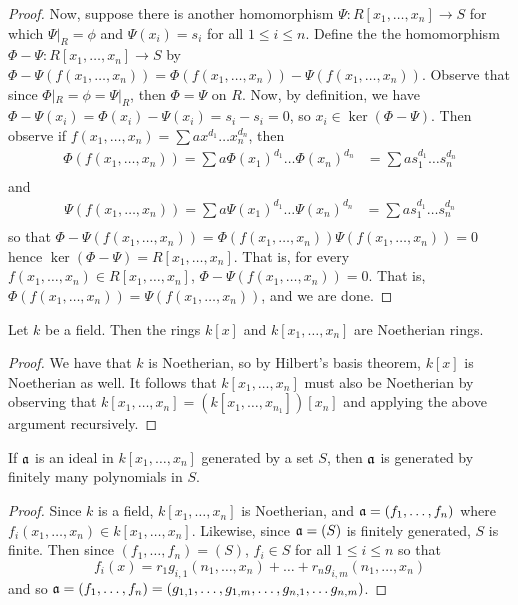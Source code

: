 \begin{proof}
  Now, suppose there is another homomorphism $\Psi:R[x_1, \dots, x_n]
  \xrightarrow{} S$ for which $\Psi|_R=\phi$ and $\Psi(x_i)=s_i$ for
  all $1 \leq i \leq n$. Define the the homomorphism $\Phi-\Psi:R[x_1,
  \dots, x_n] \xrightarrow{} S$ by $\Phi-\Psi(f(x_1, \dots,
  x_n))=\Phi(f(x_1, \dots, x_n))-\Psi(f(x_1, \dots, x_n))$. Observe
  that since $\Phi|_R=\phi=\Psi|_R$, then $\Phi=\Psi$ on $R$. Now, by
  definition, we have $\Phi-\Psi(x_i)=\Phi(x_i)-\Psi(x_i)=s_i-s_i=0$,
  so $x_i \in \ker{(\Phi-\Psi)}$. Then observe if $f(x_1, \dots,
  x_n)=\sum{ax^{d_1} \dots x_n^{d_n}}$, then
  \begin{align*}
    \Phi(f(x_1, \dots, x_n))=\sum{a\Phi(x_1)^{d_1} \dots \Phi(x_n)^{d_n}}
    &= \sum{as_1^{d_1} \dots s_n^{d_n}} \\
  \end{align*}
  and
  \begin{align*}
    \Psi(f(x_1, \dots, x_n))=\sum{a\Psi(x_1)^{d_1} \dots \Psi(x_n)^{d_n}}
    &= \sum{as_1^{d_1} \dots s_n^{d_n}} \\
  \end{align*}
  so that $\Phi-\Psi(f(x_1, \dots, x_n))=\Phi(f(x_1, \dots,
  x_n))\Psi(f(x_1, \dots, x_n))=0$ hence $\ker{(\Phi-\Psi)}=R[x_1,
  \dots, x_n]$. That is, for every $f(x_1, \dots, x_n) \in R[x_1,
  \dots, x_n]$, $\Phi-\Psi(f(x_1, \dots, x_n))=0$. That is,
  $\Phi(f(x_1, \dots, x_n))=\Psi(f(x_1, \dots, x_n))$, and we are
  done.
\end{proof}

\begin{proposition}\label{proposition_7.1.7}
  Let $k$ be a field. Then the rings $k[x]$ and $k[x_1, \dots, x_n]$
  are Noetherian rings.
\end{proposition}
\begin{proof}
  We have that $k$ is Noetherian, so by Hilbert's basis theorem,
  $k[x]$ is Noetherian as well. It follows that $k[x_1, \dots, x_n]$
  must also be Noetherian by observing that $k[x_1, \dots,
  x_n]=(k[x_1, \dots, x_{n_1}])[x_n]$ and applying the above argument
  recursively.
\end{proof}
\begin{corollary}
  If $\mathfrak{a}$ is an ideal in $k[x_1, \dots, x_n]$ generated by a set
  $S$, then $\mathfrak{a}$ is generated by finitely many polynomials in $S$.
\end{corollary}
\begin{proof}
  Since $k$ is a field, $k[x_1, \dots, x_n]$ is Noetherian, and
  $\mathfrak{a}=(f_1, \dots, f_n)$ where $f_i(x_1, \dots ,x_n) \in k[x_1,
  \dots, x_n]$. Likewise, since $\mathfrak{a}=(S)$ is finitely generated, $S$
  is finite. Then since $(f_1, \dots, f_n)=(S)$, $f_i \in S$ for all
  $1 \leq i \leq n$ so that
  \begin{equation*}
    f_i(x)=r_1g_{i,1}(n_1, \dots, x_n)+\dots+r_ng_{i,m}(n_1, \dots, x_n)
  \end{equation*}
  and so $\mathfrak{a}=(f_1, \dots, f_n)=(g_{1,1}, \dots ,g_{1,m}, \dots,
  g_{n,1}, \dots g_{n,m})$.
\end{proof}

